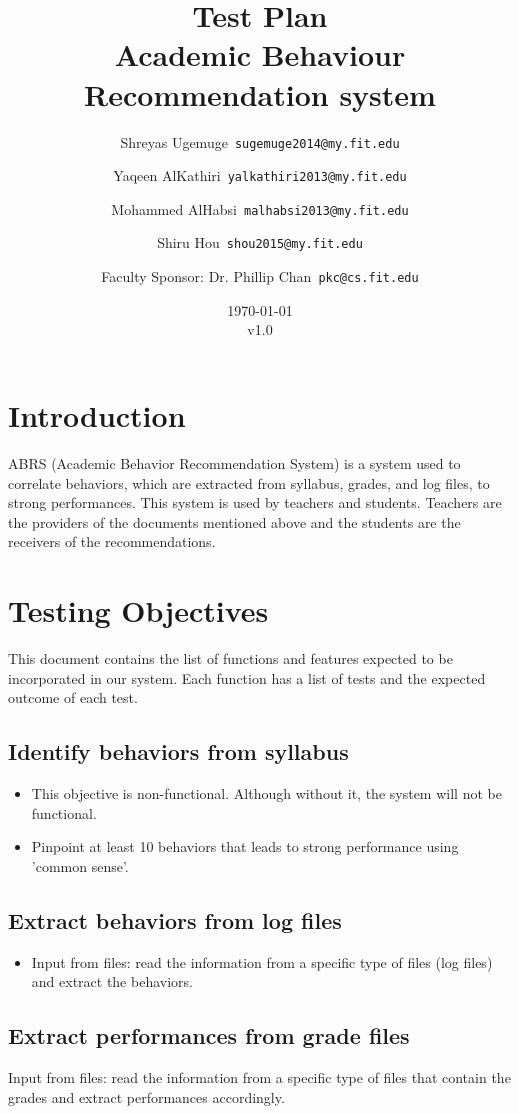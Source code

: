 \documentclass[12pt]{article}
\title{\textbf{Test Plan} \\ \hfill \break
	Academic Behaviour Recommendation system}
\author{Shreyas Ugemuge\      \texttt{sugemuge2014@my.fit.edu}
  \and
  Yaqeen AlKathiri\      \texttt{yalkathiri2013@my.fit.edu}
  \and
	Mohammed AlHabsi\      \texttt{malhabsi2013@my.fit.edu}
  \and
  Shiru Hou\      \texttt{shou2015@my.fit.edu}
  \and
  Faculty Sponsor: Dr. Phillip Chan\      \texttt{pkc@cs.fit.edu}}
\date{\today \\ v1.0}
\begin{document}
\maketitle
\pagebreak
\tableofcontents
\pagebreak
\section{Introduction}
ABRS (Academic Behavior Recommendation System) is a system used to correlate behaviors, which are extracted from syllabus, grades, and log files, to strong performances. This system is used by teachers and students. Teachers are the providers of the documents mentioned above and the students are the receivers of the recommendations.

\section{Testing Objectives}
This document contains the list of functions and features expected to be incorporated in our system. Each function has a list of tests and the expected outcome of each test.

\subsection{Identify behaviors from syllabus}
\begin{itemize}
	\item This objective is non-functional. Although without it, the system will not be functional.
	\item Pinpoint at least 10 behaviors that leads to strong performance using 'common sense'.
\end{itemize}
\subsection{Extract behaviors from log files}
\begin{itemize}
	\item Input from files: read the information from a specific type of files (log files) and extract the behaviors.
\end{itemize}

\subsection{Extract performances from grade files}
Input from files: read the information from a specific type of files that contain the grades and extract performances accordingly.
\end{document}
